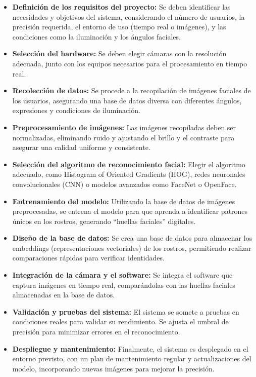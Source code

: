 \begin{itemize}
    \item \textbf{Definición de los requisitos del proyecto:} Se deben identificar las necesidades y objetivos del sistema, considerando el número de usuarios, la precisión requerida, el entorno de uso (tiempo real o imágenes), y las condiciones como la iluminación y los ángulos faciales.

    \item \textbf{Selección del hardware:} Se deben elegir cámaras con la resolución adecuada, junto con los equipos necesarios para el procesamiento en tiempo real.

    \item \textbf{Recolección de datos:} Se procede a la recopilación de imágenes faciales de los usuarios, asegurando una base de datos diversa con diferentes ángulos, expresiones y condiciones de iluminación.

    \item \textbf{Preprocesamiento de imágenes:} Las imágenes recopiladas deben ser normalizadas, eliminando ruido y ajustando el brillo y el contraste para asegurar una calidad uniforme y consistente.

    \item \textbf{Selección del algoritmo de reconocimiento facial:} Elegir el algoritmo adecuado, como Histogram of Oriented Gradients (HOG), redes neuronales convolucionales (CNN) o modelos avanzados como FaceNet o OpenFace.

    \item \textbf{Entrenamiento del modelo:} Utilizando la base de datos de imágenes preprocesadas, se entrena el modelo para que aprenda a identificar patrones únicos en los rostros, generando “huellas faciales” digitales.

    \item \textbf{Diseño de la base de datos:} Se crea una base de datos para almacenar los embeddings (representaciones vectoriales) de los rostros, permitiendo realizar comparaciones rápidas para verificar identidades.

    \item \textbf{Integración de la cámara y el software:} Se integra el software que captura imágenes en tiempo real, comparándolas con las huellas faciales almacenadas en la base de datos.

    \item \textbf{Validación y pruebas del sistema:} El sistema se somete a pruebas en condiciones reales para validar su rendimiento. Se ajusta el umbral de precisión para minimizar errores en el reconocimiento.

    \item \textbf{Despliegue y mantenimiento:} Finalmente, el sistema es desplegado en el entorno previsto, con un plan de mantenimiento regular y actualizaciones del modelo, incorporando nuevas imágenes para mejorar la precisión.
\end{itemize}

